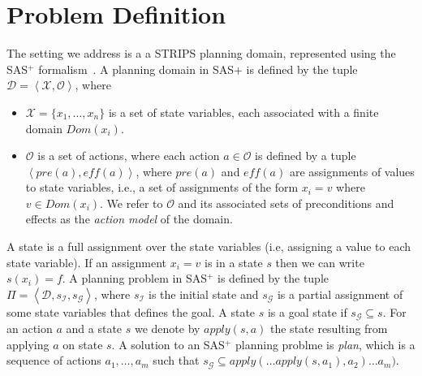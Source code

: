 \documentclass[letterpaper]{article}
\newcommand{\tuple}[1]{\ensuremath{\left \langle #1 \right \rangle }}
\newcommand{\SAS}{SAS$^+$}
\begin{document}



\section{Problem Definition}
The setting we address is a a STRIPS planning domain, represented 
using the \SAS{} formalism~\cite{backstrom}. 
A planning domain in SAS$+$ is defined by the tuple $\mathcal{D}=\tuple{\mathcal{X}, \mathcal{O}}$, where 
\begin{itemize}
    \item $\mathcal{X}=\{x_1,\ldots, x_n\}$ is a set of state variables, each associated with a finite domain $Dom(x_i)$. 
    \item $\mathcal{O}$ is a set of actions, where each action $a\in \mathcal{O}$ 
    is defined by a tuple $\tuple{pre(a), eff(a)}$, where $pre(a)$ and $eff(a)$ are 
    assignments of values to state variables, i.e., a set of assignments of the form $x_i=v$ where $v\in Dom(x_i)$. We refer to $\mathcal{O}$ and its associated sets of preconditions and effects as the {\em action model} of the domain.
\end{itemize}

A state is a full assignment over the state variables (i.e, assigning a value to each state variable). If an assignment $x_i=v$ is in a state $s$ then we can write $s(x_i)=f$. A planning problem in \SAS{} is defined by the tuple $\Pi=\tuple{\mathcal{D},s_\mathcal{I}, s_\mathcal{G}}$, where 
    $s_\mathcal{I}$ is the initial state and $s_\mathcal{G}$ 
    is a partial assignment of some state variables that defines the goal. A state $s$ is a goal state if $s_\mathcal{G}\subseteq s$. 
    For an action $a$ and a state $s$ we denote by $apply(s,a)$ the state
    resulting from applying $a$ on state $s$. 
    A solution to an \SAS{} planning problme is {\em plan}, 
    which is a sequence of actions $a_1,\ldots,a_m$ such that  $s_\mathcal{G}\subseteq apply(\ldots apply(s,a_1), a_2)\ldots a_m)$. 
    
\end{document}

